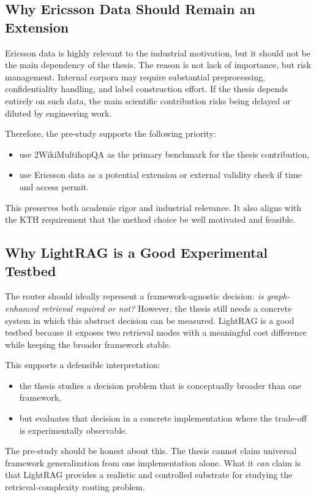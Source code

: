 \documentclass[11pt, a4paper]{article}
\begin{document}
\subsection{Why Ericsson Data Should Remain an Extension}

Ericsson data is highly relevant to the industrial motivation, but it should not be the main dependency of the thesis. The reason is not lack of importance, but risk management. Internal corpora may require substantial preprocessing, confidentiality handling, and label construction effort. If the thesis depends entirely on such data, the main scientific contribution risks being delayed or diluted by engineering work.

Therefore, the pre-study supports the following priority:
\begin{itemize}[label=--]
    \item use 2WikiMultihopQA as the primary benchmark for the thesis contribution,
    \item use Ericsson data as a potential extension or external validity check if time and access permit.
\end{itemize}

This preserves both academic rigor and industrial relevance. It also aligns with the KTH requirement that the method choice be well motivated and feasible.

\subsection{Why LightRAG is a Good Experimental Testbed}

The router should ideally represent a framework-agnostic decision: \emph{is graph-enhanced retrieval required or not?} However, the thesis still needs a concrete system in which this abstract decision can be measured. LightRAG is a good testbed because it exposes two retrieval modes with a meaningful cost difference while keeping the broader framework stable.

This supports a defensible interpretation:
\begin{itemize}[label=--]
    \item the thesis studies a decision problem that is conceptually broader than one framework,
    \item but evaluates that decision in a concrete implementation where the trade-off is experimentally observable.
\end{itemize}

The pre-study should be honest about this. The thesis cannot claim universal framework generalization from one implementation alone. What it \emph{can} claim is that LightRAG provides a realistic and controlled substrate for studying the retrieval-complexity routing problem.
\end{document}
